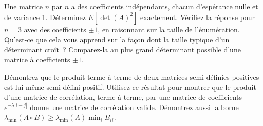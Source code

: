 \begin{question}\label{iq:iv1:linear-algebra:24}
Une matrice $n$ par $n$ a des coefficients indépendants, chacun d'espérance nulle et de variance 1. Déterminez $E[\det(A)^2]$ exactement. Vérifiez la réponse pour $n = 3$ avec des coefficients $\pm 1$, en raisonnant sur la taille de l'énumération. Qu'est-ce que cela vous apprend sur la façon dont la taille typique d'un déterminant croît~? Comparez-la au plus grand déterminant possible d'une matrice à coefficients $\pm 1$.
\end{question}

\begin{question}\label{iq:iv1:linear-algebra:25}
Démontrez que le produit terme à terme de deux matrices semi-définies positives est lui-même semi-défini positif. Utilisez ce résultat pour montrer que le produit d'une matrice de corrélation, terme à terme, par une matrice de coefficients $e^{-\lambda |i - j|}$ donne une matrice de corrélation valide. Démontrez aussi la borne $\lambda_{\min}(A \circ B) \ge \lambda_{\min}(A) \min_i B_{ii}$.
\end{question}
